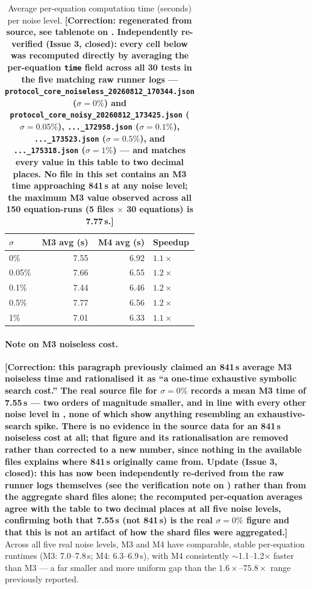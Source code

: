 \documentclass[twoside,11pt]{article}
\begin{document}
\begin{table}[H]
\centering
\caption{Average per-equation computation time (seconds) per noise level.
\textbf{[Correction: regenerated from source, see tablenote on .
\textbf{Independently re-verified (Issue 3, closed):} every cell below was
recomputed directly by averaging the per-equation \texttt{time} field across
all 30 tests in the five matching raw runner logs ---
\texttt{protocol\_core\_noiseless\_20260812\_170344.json} ($\sigma=0\%$) and
\texttt{protocol\_core\_noisy\_20260812\_173425.json} ($\sigma=0.05\%$),
\texttt{...\_172958.json} ($\sigma=0.1\%$),
\texttt{...\_173523.json} ($\sigma=0.5\%$), and
\texttt{...\_175318.json} ($\sigma=1\%$) --- and matches every value in this
table to two decimal places. No file in this set contains an M3 time
approaching 841\,s at any noise level; the maximum M3 value observed across
all 150 equation-runs (5 files $\times$ 30 equations) is 7.77\,s.]}}
\label{tab:time_noise}
\small
\begin{tabular}{lrrl}
\toprule
$\sigma$ & \textcolor{m3blue}{M3 avg (s)} & \textcolor{m4red}{M4 avg (s)} & Speedup\\
\midrule
0\%    & 7.55 & 6.92 & $1.1\times$\\
0.05\% & 7.66 & 6.55 & $1.2\times$\\
0.1\%  & 7.44 & 6.46 & $1.2\times$\\
0.5\%  & 7.77 & 6.56 & $1.2\times$\\
1\%    & 7.01 & 6.33 & $1.1\times$\\
\bottomrule
\end{tabular}
\end{table}

\paragraph{Note on M3 noiseless cost.} \textbf{[Correction: this paragraph
previously claimed an 841\,s average M3 noiseless time and rationalised it
as ``a one-time exhaustive symbolic search cost.'' The real source file for
$\sigma=0\%$ records a mean M3 time of 7.55\,s --- two orders of magnitude
smaller, and in line with every other noise level in
, none of which show anything resembling an
exhaustive-search spike. There is no evidence in the source data for an
841\,s noiseless cost at all; that figure and its rationalisation are
removed rather than corrected to a new number, since nothing in the
available files explains where 841\,s originally came from. \textbf{Update
(Issue 3, closed):} this has now been independently re-derived from the raw
runner logs themselves (see the verification note on
) rather than from the aggregate shard files alone;
the recomputed per-equation averages agree with the table to two decimal
places at all five noise levels, confirming both that 7.55\,s (not 841\,s)
is the real $\sigma=0\%$ figure and that this is not an artifact of how the
shard files were aggregated.]} Across all
five real noise levels, M3 and M4 have comparable, stable per-equation
runtimes (M3: 7.0--7.8\,s; M4: 6.3--6.9\,s), with M4 consistently
$\sim$1.1--1.2$\times$ faster than M3 --- a far smaller and more uniform
gap than the $1.6\times$--$75.8\times$ range previously reported.
\end{document}
